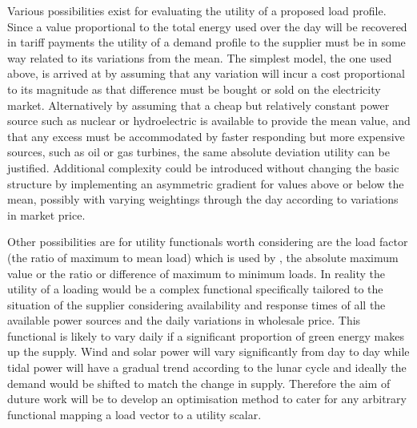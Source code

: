 \documentclass[a4paper, 10 pt, conference]{ieeeconf}  %
\begin{document}
Various possibilities exist for evaluating the utility of a proposed load profile. Since a value proportional to the total energy used over the day will be recovered in tariff payments the utility of a demand profile to the supplier must be in some way related to its variations from the mean. The simplest model, the one used above, is arrived at by assuming that any variation will incur a cost proportional to its magnitude as that difference must be bought or sold on the electricity market. Alternatively by assuming that a cheap but relatively constant power source such as nuclear or hydroelectric is available to provide the mean value, and that any excess must be accommodated by faster responding but more expensive sources, such as oil or gas turbines, the same absolute deviation utility can be justified. Additional complexity could be introduced without changing the basic structure by implementing an asymmetric gradient for values above or below the mean, possibly with varying weightings through the day according to variations in market price.

Other possibilities are for utility functionals worth considering are the load factor (the ratio of maximum to mean load) which is used by \cite{ramchurn2011agent}, the absolute maximum value or the ratio or difference of maximum to minimum loads. In reality the utility of a loading would be a complex functional specifically tailored to the situation of the supplier considering availability and response times of all the available power sources and the daily variations in wholesale price. This functional is likely to vary daily if a significant proportion of green energy makes up the supply. Wind and solar power will vary significantly from day to day while tidal power will have a gradual trend according to the lunar cycle and ideally the demand would be shifted to match the change in supply. Therefore the aim of duture work will be to develop an optimisation method to cater for any arbitrary functional mapping a load vector to a utility scalar.

\end{document}
